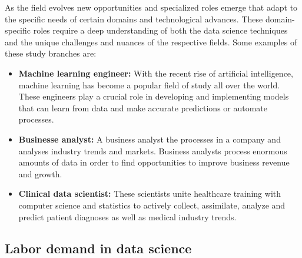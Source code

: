 \documentclass{vgtc}                          %
\begin{document}
As the field evolves new opportunities and specialized roles emerge that adapt to the specific needs of certain domains and technological advances. These domain-specific roles require 
a deep understanding of both the data science techniques and the unique challenges and nuances of the respective fields. Some examples of these study branches are:

\begin{itemize}
  \item \textbf{Machine learning engineer:} With the recent rise of artificial intelligence, machine learning has become a popular field of study all over the world. These engineers 
  play a crucial role in developing and implementing models that can learn from data and make accurate predictions or automate processes.
  \item \textbf{Businesse analyst:} A business analyst the processes in a company and analyses industry trends and markets. Business analysts process enormous amounts of data in order 
  to find opportunities to improve business revenue and growth.
  \item \textbf{Clinical data scientist:} These scientists unite healthcare training with computer science and statistics to actively collect, assimilate, analyze and predict patient 
  diagnoses as well as medical industry trends.
\end{itemize} 

\subsection{Labor demand in data science}
\end{document}
